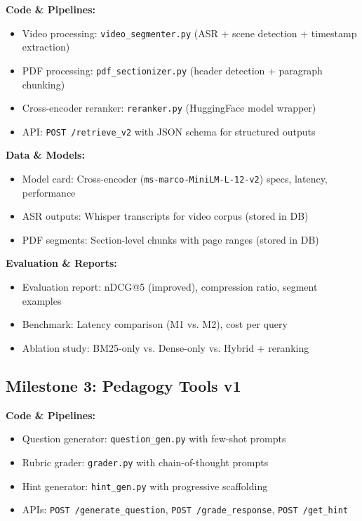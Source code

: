 \documentclass[11pt,letterpaper]{article}
\begin{document}
\textbf{Code \& Pipelines:}
\begin{itemize}
\item Video processing: \texttt{video\_segmenter.py} (ASR + scene detection + timestamp extraction)
\item PDF processing: \texttt{pdf\_sectionizer.py} (header detection + paragraph chunking)
\item Cross-encoder reranker: \texttt{reranker.py} (HuggingFace model wrapper)
\item API: \texttt{POST /retrieve\_v2} with JSON schema for structured outputs
\end{itemize}

\textbf{Data \& Models:}
\begin{itemize}
\item Model card: Cross-encoder (\texttt{ms-marco-MiniLM-L-12-v2}) specs, latency, performance
\item ASR outputs: Whisper transcripts for video corpus (stored in DB)
\item PDF segments: Section-level chunks with page ranges (stored in DB)
\end{itemize}

\textbf{Evaluation \& Reports:}
\begin{itemize}
\item Evaluation report: nDCG@5 (improved), compression ratio, segment examples
\item Benchmark: Latency comparison (M1 vs. M2), cost per query
\item Ablation study: BM25-only vs. Dense-only vs. Hybrid + reranking
\end{itemize}

\subsection{Milestone 3: Pedagogy Tools v1}\label{subsec:deliverable-milestone-3}

\textbf{Code \& Pipelines:}
\begin{itemize}
\item Question generator: \texttt{question\_gen.py} with few-shot prompts
\item Rubric grader: \texttt{grader.py} with chain-of-thought prompts
\item Hint generator: \texttt{hint\_gen.py} with progressive scaffolding
\item APIs: \texttt{POST /generate\_question}, \texttt{POST /grade\_response}, \texttt{POST /get\_hint}
\end{itemize}
\end{document}
